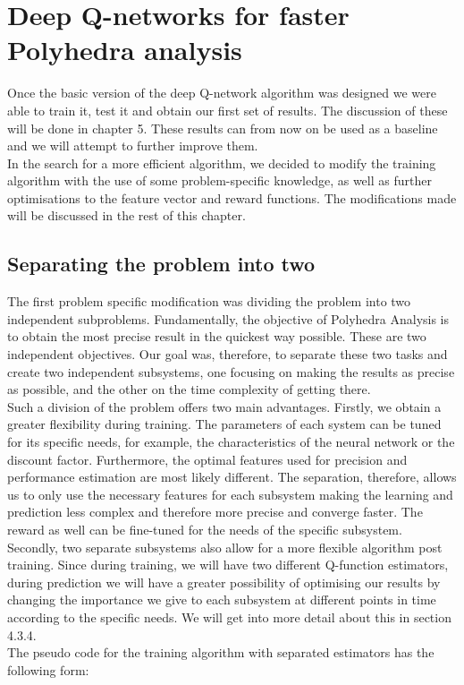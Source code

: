 \section{Deep Q-networks for faster Polyhedra analysis}
Once the basic version of the deep Q-network algorithm was designed we were able to train it, test it and obtain our first set of results. The discussion of these will be done in chapter 5. These results can from now on be used as a baseline and we will attempt to further improve them.\\
In the search for a more efficient algorithm, we decided to modify the training algorithm with the use of some problem-specific knowledge, as well as further optimisations to the feature vector and reward functions. The modifications made will be discussed in the rest of this chapter.


\subsection{Separating the problem into two}
The first problem specific modification was dividing the problem into two independent subproblems. Fundamentally, the objective of Polyhedra Analysis is to obtain the most precise result in the quickest way possible. These are two independent objectives. Our goal was, therefore, to separate these two tasks and create two independent subsystems, one focusing on making the results as precise as possible, and the other on the time complexity of getting there.\\
 Such a division of the problem offers two main advantages. Firstly, we obtain a greater flexibility during training. The parameters of each system can be tuned for its specific needs, for example, the characteristics of the neural network or the discount factor. Furthermore, the optimal features used for precision and performance estimation are most likely different. The separation, therefore, allows us to only use the necessary features for each subsystem making the learning and prediction less complex and therefore more precise and converge faster. The reward as well can be fine-tuned for the needs of the specific subsystem.\\ 
 Secondly, two separate subsystems also allow for a more flexible algorithm post training. Since during training, we will have two different Q-function estimators, during prediction we will have a greater possibility of optimising our results by changing the importance we give to each subsystem at different points in time according to the specific needs. We will get into more detail about this in section 4.3.4.\\
 The pseudo code for the training algorithm with separated estimators has the following form:


